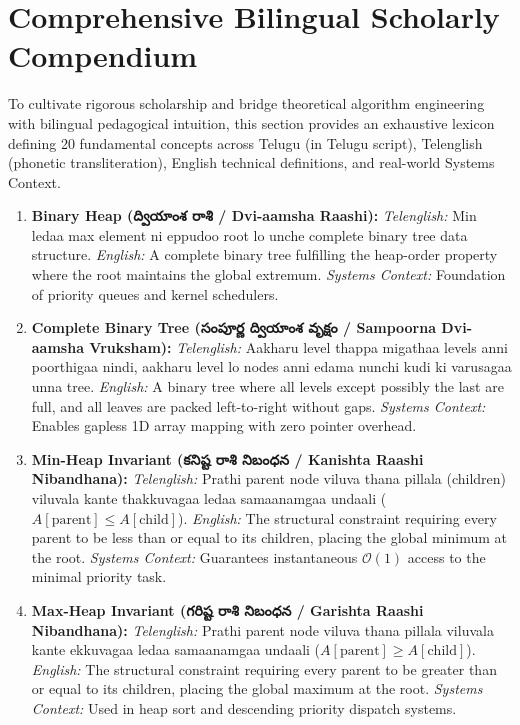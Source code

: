 \documentclass[10pt,twocolumn,letterpaper]{article}
\begin{document}
\section{Comprehensive Bilingual Scholarly Compendium}
\label{sec:bilingual}

To cultivate rigorous scholarship and bridge theoretical algorithm engineering with bilingual pedagogical intuition, this section provides an exhaustive lexicon defining 20 fundamental concepts across Telugu (in Telugu script), Telenglish (phonetic transliteration), English technical definitions, and real-world Systems Context.

\begin{enumerate}
    \item \textbf{Binary Heap (ద్వియాంశ రాశి / Dvi-aamsha Raashi):}
    \textit{Telenglish:} Min ledaa max element ni eppudoo root lo unche complete binary tree data structure.
    \textit{English:} A complete binary tree fulfilling the heap-order property where the root maintains the global extremum.
    \textit{Systems Context:} Foundation of priority queues and kernel schedulers.

    \item \textbf{Complete Binary Tree (సంపూర్ణ ద్వియాంశ వృక్షం / Sampoorna Dvi-aamsha Vruksham):}
    \textit{Telenglish:} Aakharu level thappa migathaa levels anni poorthigaa nindi, aakharu level lo nodes anni edama nunchi kudi ki varusagaa unna tree.
    \textit{English:} A binary tree where all levels except possibly the last are full, and all leaves are packed left-to-right without gaps.
    \textit{Systems Context:} Enables gapless 1D array mapping with zero pointer overhead.

    \item \textbf{Min-Heap Invariant (కనిష్ట రాశి నిబంధన / Kanishta Raashi Nibandhana):}
    \textit{Telenglish:} Prathi parent node viluva thana pillala (children) viluvala kante thakkuvagaa ledaa samaanamgaa undaali ($A[\text{parent}] \le A[\text{child}]$).
    \textit{English:} The structural constraint requiring every parent to be less than or equal to its children, placing the global minimum at the root.
    \textit{Systems Context:} Guarantees instantaneous $\mathcal{O}(1)$ access to the minimal priority task.

    \item \textbf{Max-Heap Invariant (గరిష్ట రాశి నిబంధన / Garishta Raashi Nibandhana):}
    \textit{Telenglish:} Prathi parent node viluva thana pillala viluvala kante ekkuvagaa ledaa samaanamgaa undaali ($A[\text{parent}] \ge A[\text{child}]$).
    \textit{English:} The structural constraint requiring every parent to be greater than or equal to its children, placing the global maximum at the root.
    \textit{Systems Context:} Used in heap sort and descending priority dispatch systems.


\end{enumerate}
\end{document}
